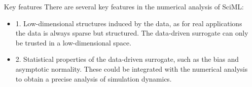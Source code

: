 \documentclass{beamer}
\begin{document}
\begin{frame}{Key features}
	There are several key features in the numerical analysis of SciML:
	\begin{itemize}
		\item 1. Low-dimensional structures induced by the data, as for real applications the data is always sparse but structured. The data-driven surrogate can only be 
		trusted in a low-dimensional space.
		\item 2. Statistical properties of the data-driven surrogate, such as the bias and asymptotic normality. These could be integrated with the numerical analysis to 
		obtain a precise analysis of simulation dynamics.
	\end{itemize}
\end{frame}

\end{document}
